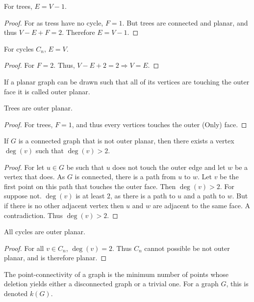         \begin{theorem}
        For trees, $E=V-1$.
        \end{theorem}
        \begin{proof}
        For as tress have no cycle, $F=1$. But trees are connected and planar, and thus $V-E+F = 2$. Therefore $E=V-1$.
        \end{proof}
        \begin{theorem}
        For cycles $C_n$, $E=V$.
        \end{theorem}
        \begin{proof}
        For $F=2$. Thus, $V-E+2=2\Rightarrow V=E$.
        \end{proof}
        \begin{definition}
        If a planar graph can be drawn such that all of its vertices are touching the outer face it is called outer planar.
        \end{definition}
        \begin{theorem}
        Trees are outer planar.
        \end{theorem}
        \begin{proof}
        For trees, $F=1$, and thus every vertices touches the outer (Only) face.
        \end{proof}
        \begin{theorem}
        If $G$ is a connected graph that is not outer planar, then there exists a vertex $\deg(v)$ such that $\deg(v)>2$.
        \end{theorem}
        \begin{proof}
        For let $u \in G$ be such that $u$ does not touch the outer edge and let $w$ be a vertex that does. As $G$ is connected, there is a path from $u$ to $w$. Let $v$ be the first point on this path that touches the outer face. Then $\deg(v)>2$. For suppose not. $\deg(v)$ is at least $2$, as there is a path to $u$ and a path to $w$. But if there is no other adjacent vertex then $u$ and $w$ are adjacent to the same face. A contradiction. Thus $\deg(v)>2$.
        \end{proof}
        \begin{theorem}
        All cycles are outer planar.
        \end{theorem}
        \begin{proof}
        For all $v\in C_n$, $\deg(v)=2$. Thus $C_n$ cannot possible be not outer planar, and is therefore planar.
        \end{proof}
        \begin{definition}
        The point-connectivity of a graph is the minimum number of points whose deletion yields either a disconnected graph or a trivial one. For a graph $G$, this is denoted $k(G)$.
        \end{definition}
